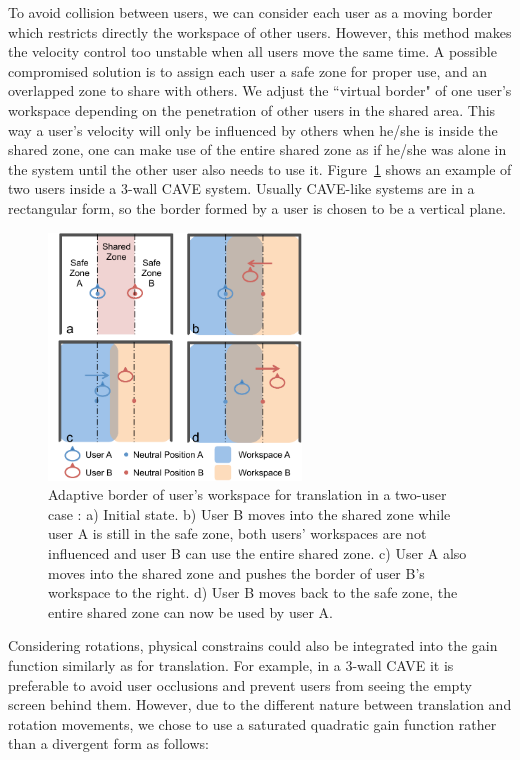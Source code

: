To avoid collision between users, we can consider each user as a moving border which restricts directly the workspace of other users. However, this method makes the velocity control too unstable when all users move the same time. A possible compromised solution is to assign each user a safe zone for proper use, and an overlapped zone to share with others. We adjust the ``virtual border" of one user's workspace depending on the penetration of other users in the shared area. This way a user's velocity will only be influenced by others when he/she is inside the shared zone, one can make use of the entire shared zone as if he/she was alone in the system until the other user also needs to use it. Figure~\ref{fig:3_adaptive_trans_border} shows an example of two users inside a 3-wall CAVE system. Usually CAVE-like systems are in a rectangular form, so the border formed by a user is chosen to be a vertical plane.

\begin{figure}[tb]
\begin{center}
\includegraphics[width=0.6\textwidth]{figures/ch3/adaptive_trans_border}
\end{center}
\caption{\label{fig:3_adaptive_trans_border}Adaptive border of user's workspace for translation in a two-user case : a) Initial state. b) User B moves into the shared zone while user A is still in the safe zone, both users' workspaces are not influenced and user B can use the entire shared zone. c) User A also moves into the shared zone and pushes the border of user B's workspace to the right. d) User B moves back to the safe zone, the entire shared zone can now be used by user A.}
\end{figure}

Considering rotations, physical constrains could also be integrated into the gain function similarly as for translation. For example, in a 3-wall CAVE it is preferable to avoid user occlusions and prevent users from seeing the empty screen behind them. However, due to the different nature between translation and rotation movements, we chose to use a saturated quadratic gain function rather than a divergent form as follows:

